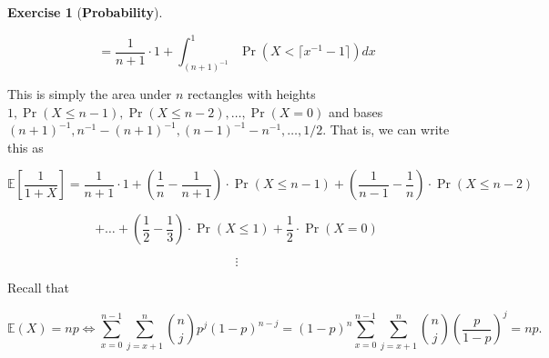 \documentclass{article}
\theoremstyle{definition}
\newtheorem{exercise}{Exercise}
\theoremstyle{definition}
\theoremstyle{definition}
\theoremstyle{definition}
\newcommand{\E}{\mathbb{E}}
\begin{document}
\begin{exercise}[\textbf{Probability}]
\begin{enumerate}[(a)]
 \[
 = \frac{1}{n+1} \cdot 1 + \int_{(n+1)^{-1}}^{1} \Pr \left( X < \lceil x^{-1} - 1\rceil \right) dx 
 \]

%

This is simply the area under \(n\) rectangles with heights \(1, \Pr(X \leq n-1), \Pr(X \leq n- 2), \ldots, \Pr(X =0)\) and bases \((n+1)^{-1}, n^{-1} - (n+1)^{-1}, (n-1)^{-1} - n^{-1},  \ldots, 1/2\). That is, we can write this as

\[
\E \left[ \frac{1}{1 + X} \right] = \frac{1}{n+1} \cdot 1 + \left( \frac{1}{n} - \frac{1}{n+1} \right) \cdot \Pr(X \leq n-1) + \left( \frac{1}{n-1} - \frac{1}{n} \right) \cdot \Pr(X \leq n-2) 
\]

\[
+ \ldots  + \left( \frac{1}{2} - \frac{1}{3} \right)  \cdot \Pr(X\leq 1)  + \frac{1}{2} \cdot \Pr(X=0) 
\]

%

\[
\vdots
\]

Recall that 

\[
\E(X) = np \iff \sum_{x=0}^{n-1} \sum_{j=x+1}^n  \binom{n}{j} p^j(1-p)^{n-j}   =  (1-p) ^n\sum_{x=0}^{n-1} \sum_{j=x+1}^n  \binom{n}{j} \left( \frac{p}{1-p} \right) ^j= np.
\]

\end{enumerate}

\end{exercise}
\end{document}
